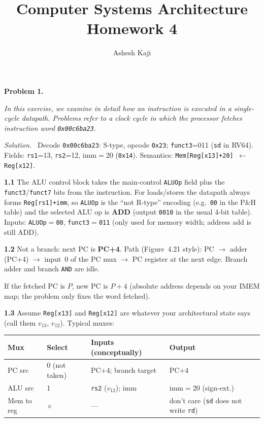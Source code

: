 \documentclass[12pt]{article}
\title{Computer Systems Architecture\\Homework 4}
\author{Ashesh Kaji}
\date{}
\newcommand{\problem}[1]{\vspace{0.8em}\noindent\textbf{Problem #1.}\vspace{0.35em}}
\newenvironment{solution}{\par\noindent\textit{Solution.}\ }{\par\vspace{1.1em}}
\newcommand{\subproblem}[1]{\par\vspace{0.45em}\noindent\textbf{#1}\quad}
\newcommand{\assigntext}[1]{\par\vspace{0.25em}\small\textit{#1}\par\vspace{0.35em}}
\begin{document}
\maketitle

\problem{1}
\assigntext{In this exercise, we examine in detail how an instruction is executed in a single-cycle datapath. Problems refer to a clock cycle in which the processor fetches instruction word \texttt{0x00c6ba23}.}

\begin{solution}
Decode \texttt{0x00c6ba23}: S-type, opcode \texttt{0x23}; \texttt{funct3}=011 (\texttt{sd} in RV64). Fields: \texttt{rs1}=13, \texttt{rs2}=12, imm$=$20 (\texttt{0x14}). Semantics: \texttt{Mem[Reg[x13]+20] $\leftarrow$ Reg[x12]}.

\subproblem{1.1}
The ALU control block takes the main-control \texttt{ALUOp} field plus the \texttt{funct3}/\texttt{funct7} bits from the instruction. For loads/stores the datapath always forms \texttt{Reg[rs1]+imm}, so \texttt{ALUOp} is the ``not R-type'' encoding (e.g.\ \texttt{00} in the P\&H table) and the selected ALU op is \textbf{ADD} (output \texttt{0010} in the usual 4-bit table). Inputs: \texttt{ALUOp}$=$\texttt{00}, \texttt{funct3}$=$\texttt{011} (only used for memory width; address add is still ADD).

\subproblem{1.2}
Not a branch: next PC is \textbf{PC+4}. Path (Figure~4.21 style): PC $\rightarrow$ adder (PC+4) $\rightarrow$ input~0 of the PC mux $\rightarrow$ PC register at the next edge. Branch adder and branch \texttt{AND} are idle.

\begin{center}
\end{center}
If the fetched PC is $P$, new PC is $P+4$ (absolute address depends on your IMEM map; the problem only fixes the word fetched).

\subproblem{1.3}
Assume \texttt{Reg[x13]} and \texttt{Reg[x12]} are whatever your architectural state says (call them $v_{13}$, $v_{12}$). Typical muxes:
\begin{center}
\begin{tabular}{@{}llll@{}}
\toprule
Mux & Select & Inputs (conceptually) & Output \\
\midrule
PC src & 0 (not taken) & PC+4; branch target & PC+4 \\
ALU src & 1 & \texttt{rs2} ($v_{12}$); imm & imm$=$20 (sign-ext.) \\
Mem to reg & $\times$ & --- & don't care (\texttt{sd} does not write \texttt{rd}) \\
\bottomrule
\end{tabular}
\end{center}


\end{solution}
\end{document}
